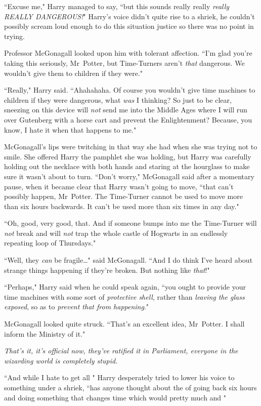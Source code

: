 ``Excuse me," Harry managed to say, ``but this sounds really really \emph{really REALLY DANGEROUS!}" Harry's voice didn't quite rise to a shriek, he couldn't possibly scream loud enough to do this situation justice so there was no point in trying.

Professor McGonagall looked upon him with tolerant affection. ``I'm glad you're taking this seriously, Mr~Potter, but Time-Turners aren't \emph{that} dangerous. We wouldn't give them to children if they were."

``Really," Harry said. ``Ahahahaha. Of course you wouldn't give time machines to children if they were dangerous, what \emph{was} I thinking? So just to be clear, sneezing on this device will \emph{not} send me into the Middle Ages where I will run over Gutenberg with a horse cart and prevent the Enlightenment? Because, you know, I hate it when that happens to me."

McGonagall's lips were twitching in that way she had when she was trying not to smile. She offered Harry the pamphlet she was holding, but Harry was carefully holding out the necklace with both hands and staring at the hourglass to make sure it wasn't about to turn. ``Don't worry," McGonagall said after a momentary pause, when it became clear that Harry wasn't going to move, ``that can't possibly happen, Mr~Potter. The Time-Turner cannot be used to move more than six hours backwards. It can't be used more than six times in any day."

``Oh, good, very good, that. And if someone bumps into me the Time-Turner will \emph{not} break and will \emph{not} trap the whole castle of Hogwarts in an endlessly repeating loop of Thursdays."

``Well, they \emph{can} be fragile{\ldots}" said McGonagall. ``And I do think I've heard about strange things happening if they're broken. But nothing like \emph{that}!"

``Perhaps," Harry said when he could speak again, ``you ought to provide your time machines with some sort of \emph{protective shell}, rather than \emph{leaving the glass exposed}, so as to \emph{prevent that from happening}."

McGonagall looked quite struck. ``That's an excellent idea, Mr~Potter. I shall inform the Ministry of it."

\emph{That's it, it's official now, they've ratified it in Parliament, everyone in the wizarding world is completely stupid.}

``And while I hate to get all " Harry desperately tried to lower his voice to something under a shriek, ``has anyone thought about the  of going back six hours and doing something that changes time which would pretty much  and "

